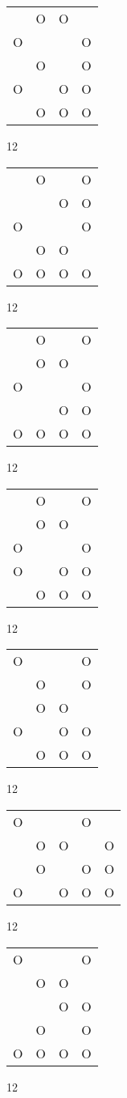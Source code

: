 \begin{tabular}{|m{0.2cm}m{0.2cm}m{0.2cm}m{0.2cm}|}\hline
 &O&O& \\
O& & &O\\
 &O& &O\\
O& &O&O\\
 &O&O&O\\
\hline\end{tabular}12
\begin{tabular}{|m{0.2cm}m{0.2cm}m{0.2cm}m{0.2cm}|}\hline
 &O& &O\\
 & &O&O\\
O& & &O\\
 &O&O& \\
O&O&O&O\\
\hline\end{tabular}12
\begin{tabular}{|m{0.2cm}m{0.2cm}m{0.2cm}m{0.2cm}|}\hline
 &O& &O\\
 &O&O& \\
O& & &O\\
 & &O&O\\
O&O&O&O\\
\hline\end{tabular}12
\begin{tabular}{|m{0.2cm}m{0.2cm}m{0.2cm}m{0.2cm}|}\hline
 &O& &O\\
 &O&O& \\
O& & &O\\
O& &O&O\\
 &O&O&O\\
\hline\end{tabular}12
\begin{tabular}{|m{0.2cm}m{0.2cm}m{0.2cm}m{0.2cm}|}\hline
O& & &O\\
 &O& &O\\
 &O&O& \\
O& &O&O\\
 &O&O&O\\
\hline\end{tabular}12
\begin{tabular}{|m{0.2cm}m{0.2cm}m{0.2cm}m{0.2cm}m{0.2cm}|}\hline
O& & &O& \\
 &O&O& &O\\
 &O& &O&O\\
O& &O&O&O\\
\hline\end{tabular}12
\begin{tabular}{|m{0.2cm}m{0.2cm}m{0.2cm}m{0.2cm}|}\hline
O& & &O\\
 &O&O& \\
 & &O&O\\
 &O& &O\\
O&O&O&O\\
\hline\end{tabular}12
